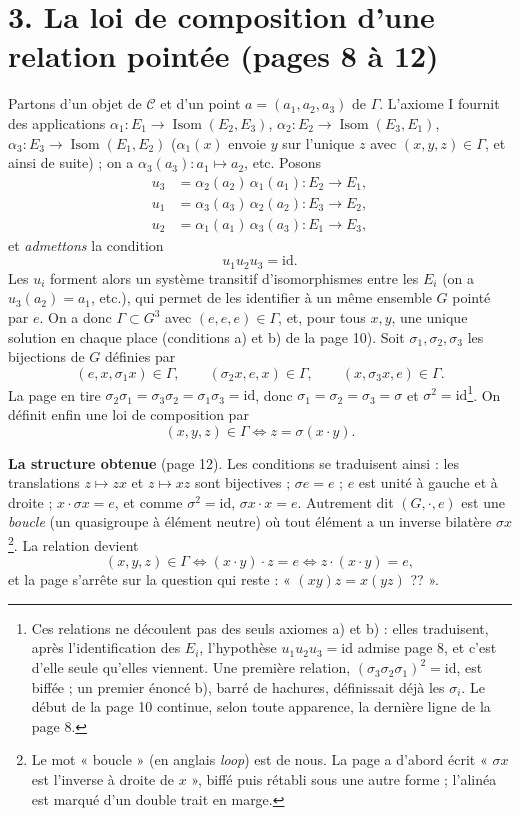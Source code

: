 \documentclass[11pt,a4paper]{article}
\begin{document}
\section*{3. La loi de composition d'une relation pointée (pages 8 à 12)}

Partons d'un objet de $\mathcal{C}$ et d'un point $a = (a_1, a_2, a_3)$ de
$\Gamma$. L'axiome I fournit des applications $\alpha_1 : E_1 \to
\operatorname{Isom}(E_2, E_3)$, $\alpha_2 : E_2 \to \operatorname{Isom}(E_3,
E_1)$, $\alpha_3 : E_3 \to \operatorname{Isom}(E_1, E_2)$ ($\alpha_1(x)$
envoie $y$ sur l'unique $z$ avec $(x, y, z) \in \Gamma$, et ainsi de suite) ;
on a $\alpha_3(a_3) : a_1 \mapsto a_2$, etc. Posons
\[
\begin{aligned}
u_3 &= \alpha_2(a_2)\, \alpha_1(a_1) : E_2 \to E_1, \\
u_1 &= \alpha_3(a_3)\, \alpha_2(a_2) : E_3 \to E_2, \\
u_2 &= \alpha_1(a_1)\, \alpha_3(a_3) : E_1 \to E_3 ,
\end{aligned}
\]
et \emph{admettons} la condition
\[
u_1 u_2 u_3 = \mathrm{id} .
\]
Les $u_i$ forment alors un système transitif d'isomorphismes entre les $E_i$
(on a $u_3(a_2) = a_1$, etc.), qui permet de les identifier à un même
ensemble $G$ pointé par $e$. On a donc $\Gamma \subset G^3$ avec $(e, e, e)
\in \Gamma$, et, pour tous $x, y$, une unique solution en chaque place
(conditions a) et b) de la page 10). Soit $\sigma_1, \sigma_2, \sigma_3$ les
bijections de $G$ définies par
\[
(e, x, \sigma_1 x) \in \Gamma, \qquad (\sigma_2 x, e, x) \in \Gamma, \qquad
(x, \sigma_3 x, e) \in \Gamma .
\]
La page en tire $\sigma_2\sigma_1 = \sigma_3\sigma_2 = \sigma_1\sigma_3 =
\mathrm{id}$, donc $\sigma_1 = \sigma_2 = \sigma_3 = \sigma$ et $\sigma^2 =
\mathrm{id}$\footnote{Ces relations ne découlent pas des seuls axiomes a) et
b) : elles traduisent, après l'identification des $E_i$, l'hypothèse $u_1 u_2
u_3 = \mathrm{id}$ admise page 8, et c'est d'elle seule qu'elles viennent. Une
première relation, $(\sigma_3\sigma_2\sigma_1)^2 = \mathrm{id}$, est biffée ;
un premier énoncé b), barré de hachures, définissait déjà les $\sigma_i$. Le
début de la page 10 continue, selon toute apparence, la dernière ligne de la
page 8.}. On définit enfin une loi de composition par
\[
(x, y, z) \in \Gamma \iff z = \sigma(x \cdot y).
\]

\textbf{La structure obtenue} (page 12). Les conditions se traduisent ainsi :
les translations $z \mapsto zx$ et $z \mapsto xz$ sont bijectives ; $\sigma e =
e$ ; $e$ est unité à gauche et à droite ; $x \cdot \sigma x = e$, et comme
$\sigma^2 = \mathrm{id}$, $\sigma x \cdot x = e$. Autrement dit $(G, \cdot, e)$
est une \emph{boucle} (un quasigroupe à élément neutre) où tout élément a un
inverse bilatère $\sigma x$\footnote{Le mot « boucle » (en anglais
\emph{loop}) est de nous. La page a d'abord écrit « $\sigma x$ est l'inverse à
droite de $x$ », biffé puis rétabli sous une autre forme ; l'alinéa est marqué
d'un double trait en marge.}. La relation devient
\[
(x, y, z) \in \Gamma \iff (x \cdot y) \cdot z = e \iff z \cdot (x \cdot y) = e,
\]
et la page s'arrête sur la question qui reste : « $(xy)z = x(yz)$ ?? ».
\end{document}
